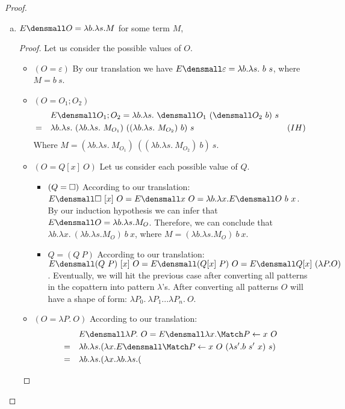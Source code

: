 \begin{proof}
\begin{enumerate}[(a)]
\item $E\den{O} = \lambda b. \lambda s. M$ for some term $M$,
\begin{proof}
    Let us consider the possible values of $O$.
    \begin{itemize}
    \item $(O = \varepsilon)$ By our translation we have $E\den{\varepsilon} = \lambda b. \lambda s. ~b ~s$, where $M= b ~s$.
    \item $(O = O_1;O_2)$
        \begin{align*}
            & \quad E\den{O_1;O_2} = \lambda b. \lambda s. ~\den{O_1} ~(\den{O_2} ~b) ~s\\
            =& \quad \lambda b. \lambda s. ~(\lambda b. \lambda s. ~M_{O_1}) ~((\lambda b. \lambda s. ~M_{O_2}) ~b) ~s & (IH)
        \end{align*}
        Where $M=(\lambda b. \lambda s. ~M_{O_1}) ~((\lambda b. \lambda s. ~M_{O_2}) ~b) ~s$.
    \item $(O = Q[x] ~O)$ Let us consider each possible value of $Q$.
        \begin{itemize}
            \item $(Q=\square)$ According to our translation: $E\den{\hole ~ [x] ~O} = E\den{x ~O} = \lambda b. \lambda x. E\den{O} ~ b ~ x$.
            By our induction hypothesis we can infer that $E\den{O}=\lambda b. \lambda s. M_O$.
            Therefore, we can conclude that $\lambda b. \lambda x. ~(\lambda b. \lambda s. M_O) ~ b ~ x$, where $ M = (\lambda b. \lambda s. M_O) ~ b ~ x$.
            \item $Q=(Q ~P)$ According to our translation: $E\den{(Q ~P) ~ [x] ~O} = E\den{(Q[x] ~P) ~O} = E\den{Q[x] ~ (\lambda P. O)}$.
            Eventually, we will hit the previous case after converting all patterns in the copattern into pattern $\lambda$'s.
            After converting all patterns $O$ will have a shape of form: $\lambda P_0. ~\lambda P_1 ... \lambda P_n. ~O$.
        \end{itemize}
    \item $(O = \lambda P. ~O)$ According to our translation:
        \begin{align*} 
            & \quad E\den{\lambda P. ~O} = E\den{\lambda x. \Match P \gets x ~ O}\\
            =& \quad \lambda b. \lambda s. (\lambda x. E\den{\Match P \gets x ~ O} ~ (\lambda s'. b ~ s' ~ x) ~ s) \\
            =& \quad \lambda b. \lambda s. (\lambda x. \lambda b. \lambda s. (

\end{align*}
\end{itemize}
\end{proof}
\end{enumerate}
\end{proof}

